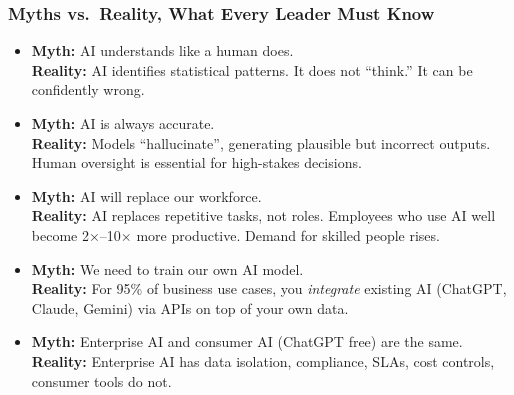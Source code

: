 \begin{frame}[fragile]\frametitle{Myths vs.\ Reality, What Every Leader Must Know}

\begin{itemize}
  \item \textbf{Myth:} AI understands like a human does.\\
    \textbf{Reality:} AI identifies statistical patterns. It does not ``think.'' It can be confidently wrong.

  \item \textbf{Myth:} AI is always accurate.\\
    \textbf{Reality:} Models ``hallucinate'', generating plausible but incorrect outputs. Human oversight is essential for high-stakes decisions.

  \item \textbf{Myth:} AI will replace our workforce.\\
    \textbf{Reality:} AI replaces repetitive tasks, not roles. Employees who use AI well become 2$\times$--10$\times$ more productive. Demand for skilled people rises.

  \item \textbf{Myth:} We need to train our own AI model.\\
    \textbf{Reality:} For 95\% of business use cases, you \textit{integrate} existing AI (ChatGPT, Claude, Gemini) via APIs on top of your own data.

  \item \textbf{Myth:} Enterprise AI and consumer AI (ChatGPT free) are the same.\\
    \textbf{Reality:} Enterprise AI has data isolation, compliance, SLAs, cost controls, consumer tools do not.
\end{itemize}

\end{frame}

